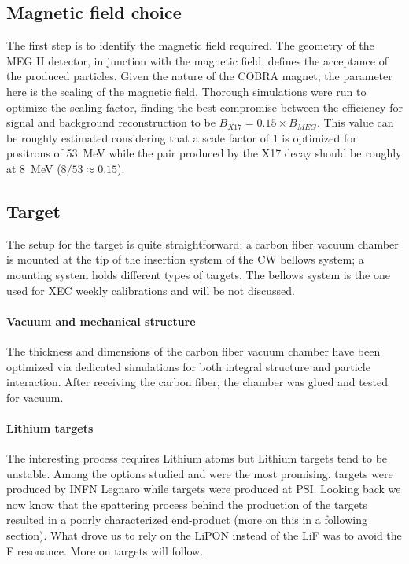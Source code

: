 \begin{refsection}
    \subsection{Magnetic field choice}
        The first step is to identify the magnetic field required. 
        The geometry of the MEG II detector, in junction with the magnetic field, defines the acceptance of the produced particles.
        Given the nature of the COBRA magnet, the parameter here is the scaling of the magnetic field.
        Thorough simulations were run to optimize the scaling factor, finding the best compromise between the efficiency for signal and background reconstruction to be $B_{X17}=0.15\times B_{MEG}$. 
        This value can be roughly estimated considering that a scale factor of 1 is optimized for positrons of \SI{53}{MeV} while the pair produced by the X17 decay should be roughly at \SI{8}{MeV} ($8/53\approx 0.15$). 
        
    \subsection{Target}
        The setup for the target is quite straightforward: a carbon fiber vacuum chamber is mounted at the tip of the insertion system of the CW bellows system; a mounting system holds different types of targets.
        The bellows system is the one used for XEC weekly calibrations and will be not discussed.
        
        \paragraph{Vacuum and mechanical structure}
        The thickness and dimensions of the carbon fiber vacuum chamber have been optimized via dedicated simulations for both integral structure and particle interaction.
        After receiving the carbon fiber, the chamber was glued and tested for vacuum.
        
        \paragraph{Lithium targets}
        The interesting process requires Lithium atoms but Lithium targets tend to be unstable. 
        Among the options studied  and  were the most promising.
         targets were produced by INFN Legnaro while  targets were produced at PSI.
        Looking back we now know that the spattering process behind the production of the  targets resulted in a poorly characterized end-product (more on this in a following section).
        What drove us to rely on the LiPON instead of the LiF was to avoid the F resonance. 
        More on targets will follow.
        

\end{refsection}
